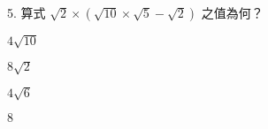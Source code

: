 \documentclass[12pt]{article}
\begin{document}
\begin{problem}
  \item[5.] 算式 $\sqrt{2} \times (\sqrt{10} \times \sqrt{5} - \sqrt{2})$ 之值為何？
  \begin{choices}
    \item $4\sqrt{10}$
    \item $8\sqrt{2}$
    \item $4\sqrt{6}$
    \item $8$
  \end{choices}
\end{problem}
\end{document}
